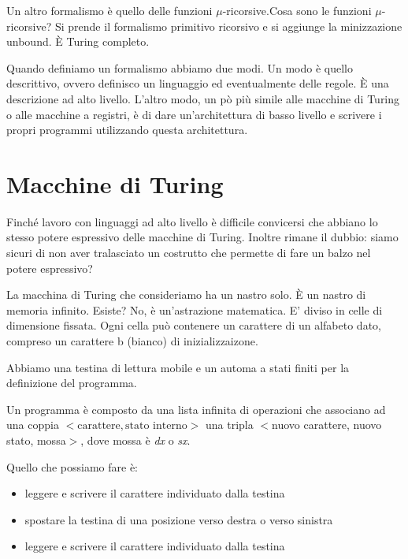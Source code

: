 Un altro formalismo è quello delle funzioni $\mu$-ricorsive.Cosa sono le funzioni $\mu$-ricorsive?
Si prende il formalismo primitivo ricorsivo e si aggiunge la minizzazione unbound. È Turing
completo.

Quando definiamo un formalismo abbiamo due modi. Un modo è quello descrittivo, ovvero definisco un
linguaggio ed eventualmente delle regole. È una descrizione ad alto livello. L'altro modo, un pò
più simile alle macchine di Turing o alle macchine a registri, è di dare un'architettura di basso
livello e scrivere i propri programmi utilizzando questa architettura.

\section{Macchine di Turing}
\label{sec:turingmachine}

Finché lavoro con linguaggi ad alto livello è difficile convicersi che abbiano lo stesso potere
espressivo delle macchine di Turing. Inoltre rimane il dubbio: siamo sicuri di non aver tralasciato
un costrutto che permette di fare un balzo nel potere espressivo?

La macchina di Turing che consideriamo ha un nastro solo. È un nastro di memoria infinito. Esiste?
No, è un'astrazione matematica. E' diviso in celle di dimensione fissata. Ogni cella può contenere
un carattere di un alfabeto dato, compreso un carattere b (bianco) di inizializzaizone.

Abbiamo una testina di lettura mobile e un automa a stati finiti per la definizione del programma.

Un programma è composto da una lista infinita di operazioni che associano ad una coppia
$<\text{carattere},\text{stato interno}>$ una tripla $<$nuovo carattere, nuovo stato,
mossa$>$, dove mossa è \textit{dx} o \textit{sx}.

Quello che possiamo fare è:
\begin{itemize}
    \item leggere e scrivere il carattere individuato dalla testina
    \item spostare la testina di una posizione verso destra o verso sinistra
    \item leggere e scrivere il carattere individuato dalla testina
\end{itemize}

